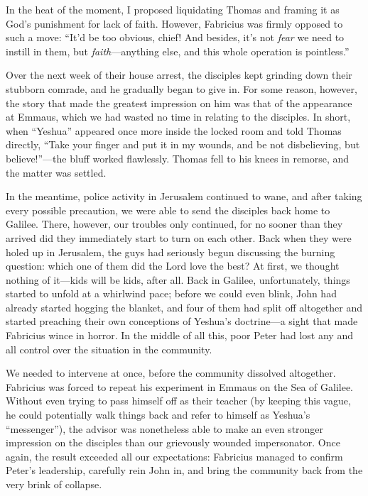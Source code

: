 In the heat of the moment, I proposed liquidating Thomas and framing it as God's punishment for lack of faith. However, Fabricius was firmly opposed to such a move: ``It'd be too obvious, chief! And besides, it's not \emph{fear} we need to instill in them, but \emph{faith}---anything else, and this whole operation is pointless.''

Over the next week of their house arrest, the disciples kept grinding down their stubborn comrade, and he gradually began to give in. For some reason, however, the story that made the greatest impression on him was that of the appearance at Emmaus, which we had wasted no time in relating to the disciples. In short, when ``Yeshua'' appeared once more inside the locked room and told Thomas directly, ``Take your finger and put it in my wounds, and be not disbelieving, but believe!''---the bluff worked flawlessly. Thomas fell to his knees in remorse, and the matter was settled.

In the meantime, police activity in Jerusalem continued to wane, and after taking every possible precaution, we were able to send the disciples back home to Galilee. There, however, our troubles only continued, for no sooner than they arrived did they immediately start to turn on each other. Back when they were holed up in Jerusalem, the guys had seriously begun discussing the burning question: which one of them did the Lord love the best? At first, we thought nothing of it---kids will be kids, after all. Back in Galilee, unfortunately, things started to unfold at a whirlwind pace; before we could even blink, John had already started hogging the blanket, and four of them had split off altogether and started preaching their own conceptions of Yeshua's doctrine---a sight that made Fabricius wince in horror. In the middle of all this, poor Peter had lost any and all control over the situation in the community.

We needed to intervene at once, before the community dissolved altogether. Fabricius was forced to repeat his experiment in Emmaus on the Sea of Galilee. Without even trying to pass himself off as their teacher (by keeping this vague, he could potentially walk things back and refer to himself as Yeshua's ``messenger''), the advisor was nonetheless able to make an even stronger impression on the disciples than our grievously wounded impersonator. Once again, the result exceeded all our expectations: Fabricius managed to confirm Peter's leadership, carefully rein John in, and bring the community back from the very brink of collapse.

